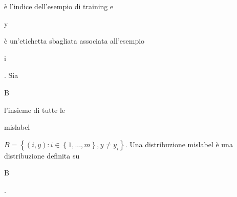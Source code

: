  \`e l'indice dell'esempio di training e \begin{it}y\end{it} \`e un'etichetta sbagliata associata 
all'esempio \begin{it}i\end{it}. Sia \begin{it}B\end{it} l'insieme di tutte le \begin{it}mislabel\end{it} 
\begin{math}B=\left\{(i,y) : i \in \left\{1, ..., m \right\}, y \ne y_i \right\}\end{math}. 
Una distribuzione mislabel \`e una distribuzione definita su \begin{it}B\end{it}.\\
\newline

